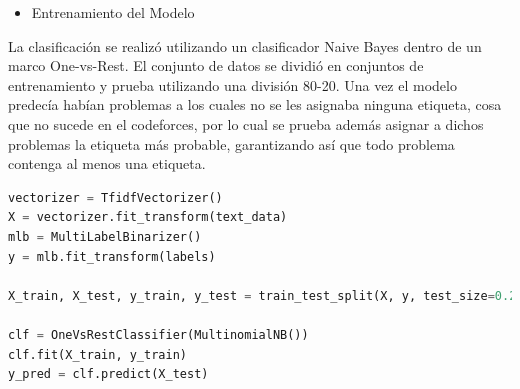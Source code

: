 \documentclass{article}
\begin{document}
\begin{itemize}
    \item Entrenamiento del Modelo
\end{itemize}
La clasificación se realizó utilizando un clasificador Naive Bayes dentro de un marco One-vs-Rest. El conjunto de datos se dividió en conjuntos de entrenamiento y prueba utilizando una división 80-20. Una vez el modelo predecía habían problemas a los cuales no se les
asignaba ninguna etiqueta, cosa que no sucede en el codeforces, por lo cual se prueba adem\'as asignar a dichos problemas la etiqueta más probable, garantizando así que todo problema contenga al menos una etiqueta.

\begin{lstlisting}[language=Python, caption=Naive Bayes]
vectorizer = TfidfVectorizer()
X = vectorizer.fit_transform(text_data)
mlb = MultiLabelBinarizer()
y = mlb.fit_transform(labels)

X_train, X_test, y_train, y_test = train_test_split(X, y, test_size=0.2, random_state=42)

clf = OneVsRestClassifier(MultinomialNB())
clf.fit(X_train, y_train)
y_pred = clf.predict(X_test)
\end{lstlisting}
\end{document}
